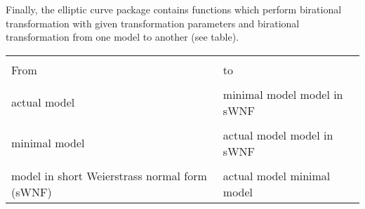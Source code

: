 \leer\leer

Finally, the elliptic curve package contains functions which perform birational 
transformation with given transformation parameters and birational 
transformation from one model to another (see table).

\leer

{\bf
\begin{center}
\begin{tabular}{|p{2.0in}|p{1.7in}|}
\hline &\\[-1.3ex]
From &
to\\[1.5ex]
\hline &\\[-1.3ex]
actual model & minimal model \newline
               model in sWNF \\
            & \\
minimal model & actual model \newline
                model in sWNF \\
            & \\
model in short Weierstrass \newline
normal form (sWNF) & actual model \newline
                minimal model \\[1.5ex]
\hline
\end{tabular}
\end{center} }

\newpage


